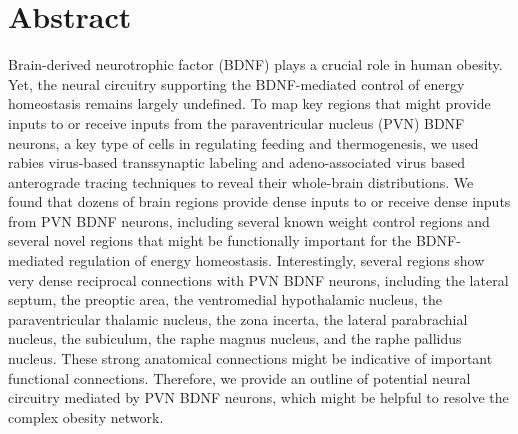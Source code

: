 \chapter*{Abstract}%
Brain-derived neurotrophic factor (BDNF) plays a crucial role in human obesity. Yet, the neural circuitry supporting the BDNF-mediated control of energy homeostasis remains largely undefined. To map key regions that might provide inputs to or receive inputs from the paraventricular nucleus (PVN) BDNF neurons, a key type of cells in regulating feeding and thermogenesis, we used rabies virus-based transsynaptic labeling and adeno-associated virus based anterograde tracing techniques to reveal their whole-brain distributions. We found that dozens of brain regions provide dense inputs to or receive dense inputs from PVN BDNF neurons, including several known weight control regions and several novel regions that might be functionally important for the BDNF-mediated regulation of energy homeostasis. Interestingly, several regions show very dense reciprocal connections with PVN BDNF neurons, including the lateral septum, the preoptic area, the ventromedial hypothalamic nucleus, the paraventricular thalamic nucleus, the zona incerta, the lateral parabrachial nucleus, the subiculum, the raphe magnus nucleus, and the raphe pallidus nucleus. These strong anatomical connections might be indicative of important functional connections. Therefore, we provide an outline of potential neural circuitry mediated by PVN BDNF neurons, which might be helpful to resolve the complex obesity network.

